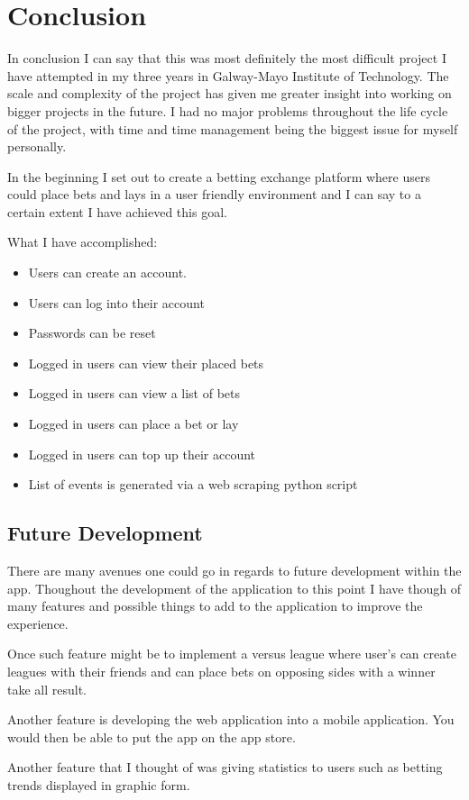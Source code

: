 \chapter{Conclusion}
In conclusion I can say that this was most definitely the most difficult project I have attempted in my three years in Galway-Mayo Institute of Technology. The scale and complexity of the project has given me greater insight into working on bigger projects in the future. I had no major problems throughout the life cycle of the project, with time and time management being the biggest issue for myself personally. 

In the beginning I set out to create a betting exchange platform where users could place bets and lays in a user friendly environment and I can say to a certain extent I have achieved this goal.

What I have accomplished: 
\begin{itemize}

  \item Users can create an account.
  \item Users can log into their account
  \item Passwords can be reset
  \item Logged in users can view their placed bets
  \item Logged in users can view a list of bets
  \item Logged in users can place a bet or lay
  \item Logged in users can top up their account
  \item List of events is generated via a web scraping python script
  
\end{itemize}

\section{Future Development}
There are many avenues one could go in regards to future development within the app. Thoughout the development of the application to this point I have though of many features and possible things to add to the application to improve the experience. 

Once such feature might be to implement a versus league where user's can create leagues with their friends and can place bets on opposing sides with a winner take all result.

Another feature is developing the web application into a mobile application. You would then be able to put the app on the app store.

Another feature that I thought of was giving statistics to users such as betting trends displayed in graphic form.


